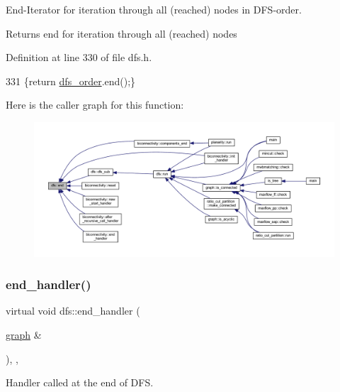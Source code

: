 End-\/\+Iterator for iteration through all (reached) nodes in D\+F\+S-\/order. 

\begin{DoxyReturn}{Returns}
end for iteration through all (reached) nodes 
\end{DoxyReturn}


Definition at line 330 of file dfs.\+h.


\begin{DoxyCode}
331     \{\textcolor{keywordflow}{return} \mbox{\hyperlink{classdfs_af70a73ace68afd91ef944f984c9f28d5}{dfs\_order}}.end();\}
\end{DoxyCode}
Here is the caller graph for this function\+:
\nopagebreak
\begin{figure}[H]
\begin{center}
\leavevmode
\includegraphics[width=350pt]{classdfs_af847633fa642258d3522e8deb26aef37_icgraph}
\end{center}
\end{figure}
\mbox{\label{classdfs_a59c512fa99ad3809db3e24347ab43b85}} 
\subsubsection{\texorpdfstring{end\+\_\+handler()}{end\_handler()}}
{\footnotesize\ttfamily virtual void dfs\+::end\+\_\+handler (\begin{DoxyParamCaption}\item[{\mbox{\hyperlink{classgraph}{graph}} \&}]{ }\end{DoxyParamCaption})\hspace{0.3cm}{\ttfamily [inline]}, {\ttfamily [virtual]}, {\ttfamily [inherited]}}



Handler called at the end of D\+FS. 


